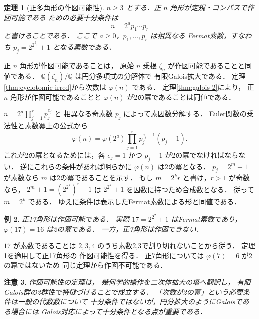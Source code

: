 \documentclass[a5paper,10pt,onecolumn]{jsarticle}
\makeatletter
\theoremstyle{mathnotetheorem}
\newtheorem{theorem}{定理}[section]
\newtheorem{example}[theorem]{例}
\newtheorem{remark}[theorem]{注意}
\renewcommand{\proofname}{証明}
\renewenvironment{proof}[1][\proofname]{%
  \par\pushQED{\qed}\normalfont\topsep4\p@\@plus2\p@\relax
  \trivlist\item[\hskip\labelsep\bfseries #1]\ignorespaces
}{\popQED\endtrivlist\@endpefalse}
\makeatother
\begin{document}
\begin{theorem}[正多角形の作図可能性]\label{thm:gauss-wantzel}
$n\ge3$ とする．正 $n$ 角形が定規・コンパスで作図可能である
ための必要十分条件は
\[
 n=2^a p_1\cdots p_r
\]
と書けることである．
ここで $a\ge0$，$p_1,\dots,p_r$ は相異なる
Fermat素数，すなわち
$p_j=2^{2^{k_j}}+1$ となる素数である．
\end{theorem}
\begin{proof}
正 $n$ 角形が作図可能であることは，
原始 $n$ 乗根 $\zeta_n$ が作図可能であることと同値である．
$\mathbb Q(\zeta_n)/\mathbb Q$ は円分多項式の分解体で
有限Galois拡大である．
定理\ref{thm:cyclotomic-irred}から次数は
$\varphi(n)$ である．
定理\ref{thm:galois-2}により，
正 $n$ 角形が作図可能であることと
$\varphi(n)$ が2の冪であることは同値である．

$n=2^a\prod_{j=1}^r p_j^{e_j}$ と
相異なる奇素数 $p_j$ によって素因数分解する．
Euler関数の乗法性と素数冪上の公式から
\[
 \varphi(n)=\varphi(2^a)
 \prod_{j=1}^r p_j^{e_j-1}(p_j-1).
\]
これが2の冪となるためには，各 $e_j=1$ かつ
$p_j-1$ が2の冪でなければならない．
逆にこれらの条件があれば明らかに
$\varphi(n)$ は2の冪となる．
$p_j=2^m+1$ が素数なら $m$ は2の冪であることを示す．
もし $m=2^kr$ と書け，$r>1$ が奇数なら，
$2^m+1=(2^{2^k})^r+1$ は
$2^{2^k}+1$ を因数に持つため合成数となる．
従って $m=2^k$ である．
ゆえに条件は表示したFermat素数による形と同値である．
\end{proof}

\begin{example}
正17角形は作図可能である．
実際 $17=2^{2^2}+1$ はFermat素数であり，
$\varphi(17)=16$ は2の冪である．
一方，正7角形は作図できない．
\end{example}
\begin{proof}
$17$ が素数であることは
$2,3,4$ のうち素数2,3で割り切れないことから従う．
定理\ref{thm:gauss-wantzel}を適用して正17角形の
作図可能性を得る．
正7角形については
$\varphi(7)=6$ が2の冪ではないため
同じ定理から作図不可能である．
\end{proof}

\begin{remark}
作図可能性の定理は，
幾何学的操作を二次体拡大の塔へ翻訳し，
有限Galois群の2群性で特徴づけることで成立する．
「次数が2の冪」という必要条件は一般の代数数について
十分条件ではないが，円分拡大のようにGaloisである場合には
Galois対応によって十分条件となる点が重要である．
\end{remark}
\end{document}
